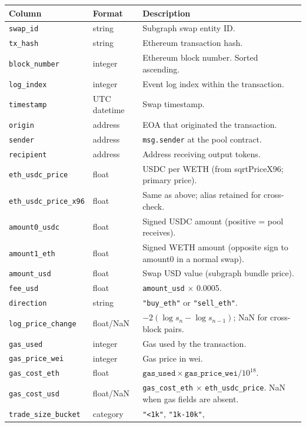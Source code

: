 \documentclass[11pt,a4paper]{article}
\begin{document}
\begin{xltabular}{\linewidth}{L{4.5cm}L{3.0cm}Y}
\toprule
\textbf{Column} & \textbf{Format} & \textbf{Description} \\
\midrule
\texttt{swap\_id} & string & Subgraph swap entity ID. \\
\texttt{tx\_hash} & string & Ethereum transaction hash. \\
\texttt{block\_number} & integer & Ethereum block number. Sorted ascending. \\
\texttt{log\_index} & integer & Event log index within the transaction. \\
\texttt{timestamp} & UTC datetime & Swap timestamp. \\
\texttt{origin} & address & EOA that originated the transaction. \\
\texttt{sender} & address & \texttt{msg.sender} at the pool contract. \\
\texttt{recipient} & address & Address receiving output tokens. \\
\texttt{eth\_usdc\_price} & float & USDC per WETH (from sqrtPriceX96;
  primary price). \\
\texttt{eth\_usdc\_price\_x96} & float & Same as above; alias retained for
  cross-check. \\
\texttt{amount0\_usdc} & float & Signed USDC amount (positive = pool
  receives). \\
\texttt{amount1\_eth} & float & Signed WETH amount (opposite sign to
  amount0 in a normal swap). \\
\texttt{amount\_usd} & float & Swap USD value (subgraph bundle price). \\
\texttt{fee\_usd} & float & \texttt{amount\_usd} $\times$ 0.0005. \\
\texttt{direction} & string & \texttt{"buy\_eth"} or \texttt{"sell\_eth"}. \\
\texttt{log\_price\_change} & float/NaN & $-2(\log s_n - \log s_{n-1})$;
  NaN for cross-block pairs. \\
\texttt{gas\_used} & integer & Gas used by the transaction. \\
\texttt{gas\_price\_wei} & integer & Gas price in wei. \\
\texttt{gas\_cost\_eth} & float & $\texttt{gas\_used} \times
  \texttt{gas\_price\_wei} / 10^{18}$. \\
\texttt{gas\_cost\_usd} & float/NaN & \texttt{gas\_cost\_eth} $\times$
  \texttt{eth\_usdc\_price}. NaN when gas fields are absent. \\
\texttt{trade\_size\_bucket} & category & \texttt{"<1k"}, \texttt{"1k-10k"},

\end{xltabular}
\end{document}
